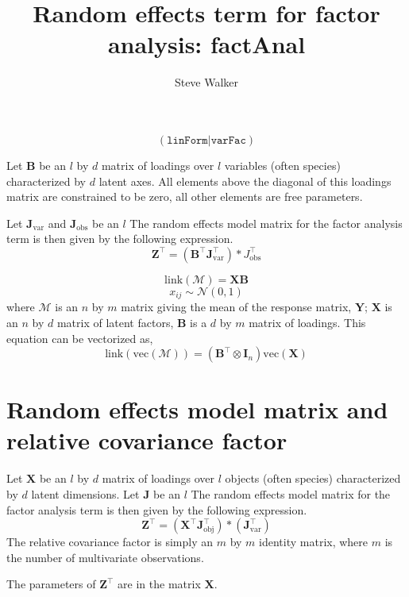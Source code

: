 \documentclass{article}\usepackage[]{graphicx}\usepackage[]{color}
\title{Random effects term for factor analysis: factAnal}
\author{Steve Walker}
\date{}
\newcommand{\trans}{^\top}
\newcommand{\link}{\ensuremath{\mathrm{link}}}
\newcommand{\mc}{\mathcal}
\newcommand{\vc}{\ensuremath{\mathrm{vec}}}
\begin{document}
\maketitle

\begin{equation}
  \label{eq:6}
  \mathtt{(linForm | varFac)}
\end{equation}

Let $\bm B$ be an $l$ by $d$ matrix of loadings over $l$ variables
(often species) characterized by $d$ latent axes. All elements above
the diagonal of this loadings matrix are constrained to be zero, all
other elements are free parameters.

Let $\bm
J_{\text{var}}$ and $\bm J_{\text{obs}}$ be an $l$ The random effects
model matrix for the factor analysis term is then given by the
following expression.
\begin{equation}
  \label{eq:5}
  \bm Z\trans = (\bm B\trans\bm J_{\text{var}}\trans) * J_{\text{obs}}\trans
\end{equation}

\newpage

\begin{equation}
  \label{eq:2}
  \link\left(\mc M\right) = 
  \bm X \bm B
\end{equation}
\begin{equation}
  \label{eq:3}
  x_{ij} \sim \mc N(0, 1)
\end{equation}
where $\mc M$ is an $n$ by $m$ matrix giving the mean of the response
matrix, $\bm Y$; $\bm X$ is an $n$ by $d$ matrix of latent factors,
$\bm B$ is a $d$ by $m$ matrix of loadings.  This equation can be
vectorized as,
\begin{equation}
  \label{eq:4}
  \link\left(\vc(\mc M)\right) = 
  \left(\bm B\trans \otimes \bm I_n\right)
  \vc(\bm X)
\end{equation}

\section{Random effects model matrix and relative covariance factor}

Let $\bm X$ be an $l$ by $d$ matrix of loadings over $l$ objects
(often species) characterized by $d$ latent dimensions. Let $\bm J$ be
an $l$ The random
effects model matrix for the factor analysis term is then given by the
following expression.
\begin{equation}
  \label{eq:1}
  \bm Z\trans = 
  \left(
    \bm X\trans \bm J\trans_{\text{obj}}
  \right) * 
  \left(
    \bm J\trans_{\text{var}}
  \right)
\end{equation}
The relative covariance factor is simply an $m$ by $m$ identity
matrix, where $m$ is the number of multivariate observations.

The parameters of $\bm Z\trans$ are in the matrix $\bm X$.  
\end{document}
